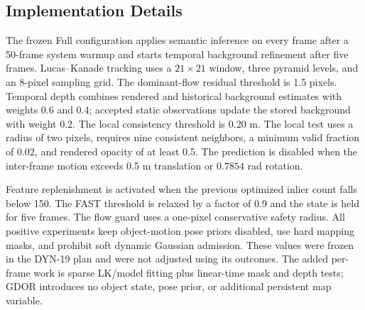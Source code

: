 \subsection{Implementation Details}

The frozen Full configuration applies semantic inference on every frame after a 50-frame system warmup and starts temporal background refinement after five frames.
Lucas--Kanade tracking uses a $21\times21$ window, three pyramid levels, and an 8-pixel sampling grid.
The dominant-flow residual threshold is 1.5 pixels.
Temporal depth combines rendered and historical background estimates with weights 0.6 and 0.4; accepted static observations update the stored background with weight 0.2.
The local consistency threshold is 0.20 m.
The local test uses a radius of two pixels, requires nine consistent neighbors, a minimum valid fraction of 0.02, and rendered opacity of at least 0.5.
The prediction is disabled when the inter-frame motion exceeds 0.5 m translation or $0.7854$ rad rotation.

Feature replenishment is activated when the previous optimized inlier count falls below 150.
The FAST threshold is relaxed by a factor of 0.9 and the state is held for five frames.
The flow guard uses a one-pixel conservative safety radius.
All positive experiments keep object-motion pose priors disabled, use hard mapping masks, and prohibit soft dynamic Gaussian admission.
These values were frozen in the DYN-19 plan and were not adjusted using its outcomes.
The added per-frame work is sparse LK/model fitting plus linear-time mask and depth tests; GDOR introduces no object state, pose prior, or additional persistent map variable.
